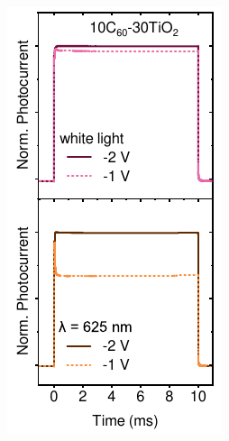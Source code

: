 \begin{figure}[htbp]
\begin{subfigure}{0.24\textwidth}
        \label{}
    \end{subfigure}
    \hfill
    \begin{subfigure}{0.24\textwidth}
        \centering
        \includegraphics[width=\textwidth]{chapters/transport_layers/images/TPC_10_30.pdf}

\end{subfigure}
\end{figure}
